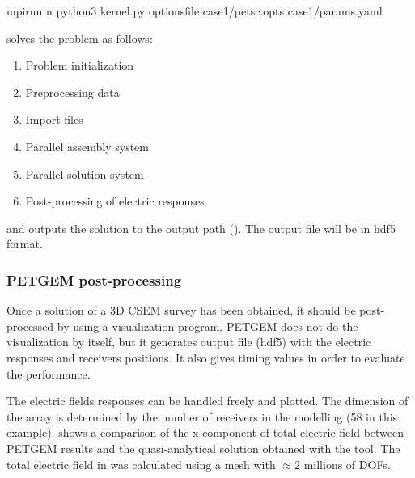 \documentclass[letterpaper,10pt,english]{sphinxmanual}
\begin{document}
\begin{sphinxVerbatim}[commandchars=\\\{\}]
\PYGZdl{} mpirun \PYGZhy{}n  python3 kernel.py \PYGZhy{}options\PYGZus{}file case1/petsc.opts case1/params.yaml
\end{sphinxVerbatim}

 solves the problem as follows:
\begin{enumerate}
%
\item {} 
Problem initialization

\item {} 
Preprocessing data

\item {} 
Import files

\item {} 
Parallel assembly system

\item {} 
Parallel solution system

\item {} 
Post-processing of electric responses

\end{enumerate}

and outputs the solution to the output path
(). The output file will be in hdf5 format.


\subsubsection{PETGEM post-processing}
\label{\detokenize{Manual:petgem-post-processing}}
Once a solution of a 3D CSEM survey has been obtained, it should be
post-processed by using a visualization program. PETGEM does not do the
visualization by itself, but it generates output file (hdf5)
with the electric responses and receivers positions. It also gives timing values
in order to evaluate the performance.

The electric fields responses can be handled freely and plotted. The
dimension of the array is determined by the
number of receivers in the modelling (58 in this example). {\hyperref[\detokenize{Manual:figure-7-9}]{}} shows
a comparison of the x-component of total electric field between PETGEM results
and the quasi-analytical solution obtained with the
 tool. The total
electric field in {\hyperref[\detokenize{Manual:figure-7-9}]{}} was calculated using a
mesh with \(\approx2\) millions of DOFs.
\end{document}
